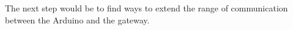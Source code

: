 The next step would be to find ways to extend the range of communication between the Arduino and the gateway.

